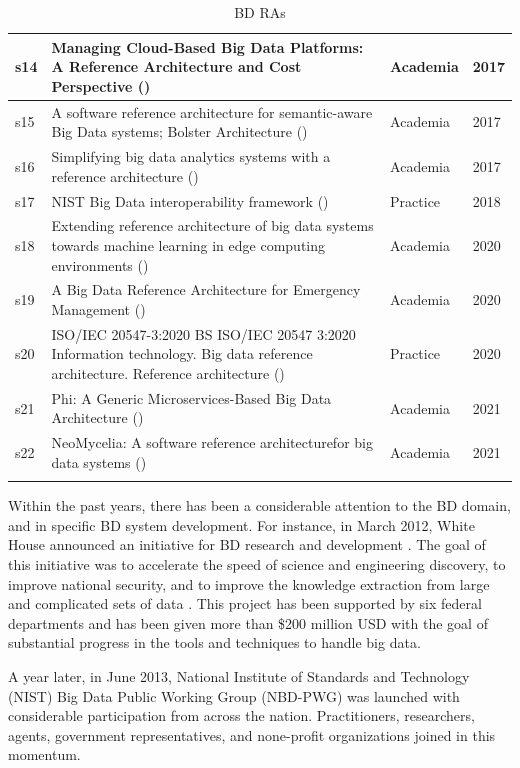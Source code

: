 \documentclass[review]{elsarticle}
\begin{document}
\begin{longtable}{ |p{0.5cm}|p{6.5cm}|p{1.5cm}|p{0.8cm}| }
    \hline
    s14 & Managing Cloud-Based Big Data Platforms: A Reference Architecture and Cost Perspective (\cite{heilig2017managing}) & Academia  &  2017   \\
    \hline
    s15 & A software reference architecture for semantic-aware Big Data systems; Bolster Architecture (\cite{Nadal}) & Academia  &  2017   \\
    \hline
    s16 & Simplifying big data analytics systems with a reference architecture (\cite{sang2017simplifying}) & Academia  &  2017   \\
    \hline
    s17 & NIST Big Data interoperability framework (\cite{Chang}) & Practice  &  2018  \\
    \hline
    s18 & Extending reference architecture of big data systems towards machine learning in edge computing environments (\cite{paakkonen2020extending})  & Academia & 2020   \\
    \hline
    s19 & A Big Data Reference Architecture for Emergency Management (\cite{iglesias2020big})  & Academia & 2020   \\
    \hline
    s20 & ISO/IEC 20547-3:2020 BS ISO/IEC 20547 3:2020 Information technology. Big data reference architecture. Reference architecture (\cite{ISO20547}) & Practice  &  2020  \\
    \hline
    s21 & Phi: A Generic Microservices-Based Big Data Architecture (\cite{maamouri2021phi})  & Academia & 2021   \\
    \hline
    s22 & NeoMycelia: A software reference architecturefor big data systems (\cite{AtaeiApsec})  & Academia & 2021   \\
    \hline
    \caption{BD RAs}
    \label{table:bdRAs}
\end{longtable}

Within the past years, there has been a considerable attention to the BD domain, and in specific BD system development. For instance, in March 2012, White House announced an initiative for BD research and development \cite{House}. The goal of this initiative was to accelerate the speed of science and engineering discovery, to improve national security, and to improve the knowledge extraction from large and complicated sets of data \cite{chang2015nist}. This project has been supported by six federal departments and has been given more than \$200 million USD with the goal of substantial progress in the tools and techniques to handle big data.

A year later, in June 2013, National Institute of Standards and Technology (NIST) Big Data Public Working Group (NBD-PWG) was launched with considerable participation from across the nation. Practitioners, researchers, agents, government representatives, and none-profit organizations joined in this momentum.
\end{document}
